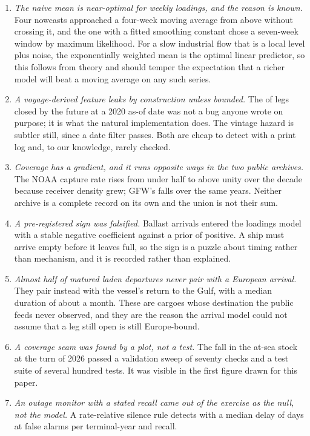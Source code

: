 \begin{enumerate}[nosep,leftmargin=1.4em]
  \item \emph{The naive mean is near-optimal for weekly loadings, and the reason is
    known.} Four nowcasts approached a four-week moving average from above without
    crossing it, and the one with a fitted smoothing constant chose a seven-week
    window by maximum likelihood. For a slow industrial flow that is a local level
    plus noise, the exponentially weighted mean is the optimal linear predictor, so
    this follows from theory and should temper the expectation that a richer model
    will beat a moving average on any such series.
  \item \emph{A voyage-derived feature leaks by construction unless bounded.} The
    \leakFutureShare{} of legs closed by the future at a 2020 as-of date was not a
    bug anyone wrote on purpose; it is what the natural implementation does. The
    vintage hazard is subtler still, since a date filter passes. Both are cheap to
    detect with a print log and, to our knowledge, rarely checked.
  \item \emph{Coverage has a gradient, and it runs opposite ways in the two public
    archives.} The NOAA capture rate rises from under half to above unity over the
    decade because receiver density grew; GFW's falls over the same years. Neither
    archive is a complete record on its own and the union is not their sum.
  \item \emph{A pre-registered sign was falsified.} Ballast arrivals entered the
    loadings model with a stable negative coefficient against a prior of positive.
    A ship must arrive empty before it leaves full, so the sign is a puzzle about
    timing rather than mechanism, and it is recorded rather than explained.
  \item \emph{Almost half of matured laden departures never pair with a European
    arrival.} They pair instead with the vessel's return to the Gulf, with a median
    duration of about a month. These are cargoes whose destination the public feeds
    never observed, and they are the reason the arrival model could not assume that
    a leg still open is still Europe-bound.
  \item \emph{A coverage seam was found by a plot, not a test.} The
    \coverageDropShare{} fall in the at-sea stock at the turn of 2026 passed a
    validation sweep of seventy checks and a test suite of several hundred tests.
    It was visible in the first figure drawn for this paper.
  \item \emph{An outage monitor with a stated recall came out of the exercise as the
    null, not the model.} A rate-relative silence rule detects with a median delay
    of \aFiveNTwoDelay{} days at \aFiveNTwoFar{} false alarms per terminal-year and
    \aFiveNTwoRecall{} recall.
\end{enumerate}

